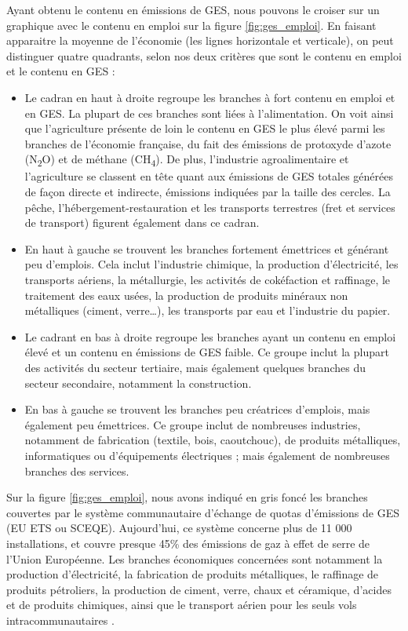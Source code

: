 Ayant obtenu le contenu en émissions de GES, nous pouvons le croiser sur un graphique avec le contenu en emploi sur la figure \ref{fig:ges_emploi}. En faisant apparaitre la moyenne de l’économie (les lignes horizontale et verticale), on peut distinguer quatre quadrants, selon nos deux critères que sont le contenu en emploi et le contenu en GES :
\begin{itemize}
	\item Le cadran en haut à droite regroupe les branches à fort contenu en emploi et en GES. La plupart de ces branches sont liées à l’alimentation. On voit ainsi que l’agriculture présente de loin le contenu en GES le plus élevé parmi les branches de l’économie française, du fait des émissions de protoxyde d’azote (N\textsubscript{2}O) et de méthane (CH\textsubscript{4}). De plus, l’industrie agroalimentaire et l’agriculture se classent en tête quant aux émissions de GES totales générées de façon directe et indirecte, émissions indiquées par la taille des cercles. La pêche, l’hébergement-restauration et les transports terrestres (fret et services de transport) figurent également dans ce cadran. 
	\item En haut à gauche se trouvent les branches fortement émettrices et générant peu d’emplois. Cela inclut l’industrie chimique, la production d’électricité, les transports aériens, la métallurgie, les activités de cokéfaction et raffinage, le traitement des eaux usées, la production de produits minéraux non métalliques (ciment, verre…), les transports par eau et l’industrie du papier.
	\item Le cadrant en bas à droite regroupe les branches ayant un contenu en emploi élevé et un contenu en émissions de GES faible. Ce groupe inclut la plupart des activités du secteur tertiaire, mais également quelques branches du secteur secondaire, notamment la construction.
	\item En bas à gauche se trouvent les branches peu créatrices d’emplois, mais également peu émettrices. Ce groupe inclut de nombreuses industries, notamment de fabrication (textile, bois, caoutchouc), de produits métalliques, informatiques ou d’équipements électriques ; mais également de nombreuses branches des services.
\end{itemize}

Sur la figure \ref{fig:ges_emploi}, nous avons indiqué en gris foncé les branches couvertes par le système communautaire d’échange de quotas d’émissions de GES (EU ETS ou SCEQE). Aujourd’hui, ce système concerne plus de 11 000 installations, et couvre presque 45\% des émissions de gaz à effet de serre de l’Union Européenne. Les branches économiques concernées sont notamment la production d’électricité, la fabrication de produits métalliques, le raffinage de produits pétroliers, la production de ciment, verre, chaux et céramique, d’acides et de produits chimiques, ainsi que le transport aérien pour les seuls vols intracommunautaires \citep{EuropeanUnion2013}.

